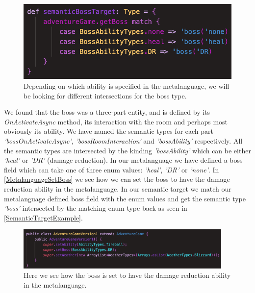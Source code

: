 \begin{figure}
	\includegraphics[width=\linewidth]{Materials/Decomposition/Boss/SemanticTarget}
	\caption{Depending on which ability is specified in the metalanguage, we will be looking for different intersections for the boss type.}
	\label{SemanticTargetExample}
\end{figure}
We found that the boss was a three-part entity, and is defined by its \textit{OnActivateAsync} method, its interaction with the room and perhaps most obviously its ability. We have named the semantic types for each part \textit{'bossOnActivateAsync'}, \textit{'bossRoomInteraction'} and \textit{'bossAbility'} respectively. All the semantic types are intersected by the kinding \textit{'bossAbility'} which can be either \textit{'heal'} or \textit{'DR'} (damage reduction). In our metalanguage we have defined a boss field which can take one of three enum values: \textit{'heal'}, \textit{'DR'} or \textit{'none'}. In \autoref{MetalanguageSetBoss} we see how we can set the boss to have the damage reduction ability in the metalanguage. In our semantic target we match our metalanguage defined boss field with the enum values and get the semantic type \textit{'boss'} intersected by the matching enum type back as seen in \autoref{SemanticTargetExample}.
\begin{figure}[H]
	\centering
	\includegraphics[width=0.95\textwidth]{Materials/Decomposition/Boss/MetalanguageSetBoss}
	\caption{Here we see how the boss is set to have the damage reduction ability in the metalanguage.}
	\label{MetalanguageSetBoss}
\end{figure}

